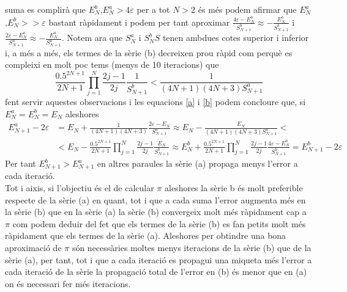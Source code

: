 \documentclass[a4paper,10pt]{article}
\renewcommand{\*}{\cdot}
\renewcommand{\epsilon}{\varepsilon}
\begin{document}
suma es complirà que $E_N^b$,$E_N^a>4\epsilon$ per a tot $N>2$ és més podem afirmar que $E_N^a$,$E_N^b>>\epsilon$ bastant ràpidament i podem per tant aproximar 
$\frac{4\epsilon-E_N^b}{S^b_{N+1}}\approx-\frac{E_N^b}{S^b_{N+1}}$ i $\frac{2\epsilon-E_N^a}{S^a_{N+1}}\approx-\frac{E_N^a}{S^a_{N+1}}$. Notem ara que $S_N^a$ i $S_N^bS$
tenen ambdues cotes superior i inferior i, a més a més, els termes de la sèrie (b) decreixen prou ràpid com perquè es compleixi en molt poc tems (menys de 10 iteracions) que
\begin{equation*}
 \frac{0.5^{2N+1}}{2N+1}\prod_{j=1}^N\frac{2j-1}{2j}\frac{1}{S^b_{N+1}}<\frac{1}{(4N+1)(4N+3)S^a_{N+1}}
\end{equation*}
fent servir aquestes observacions i les equacions \ref{a} i \ref{b} podem concloure que, si $E_N^a=E_N^b=E_N$ aleshores
\begin{equation*}
\begin{split}
 E_{N+1}^a-2\epsilon&=E_N+\frac{1}{(4N+1)(4N+3)}\frac{2\epsilon-E_N}{S^a_{N+1}}\approx E_N-\frac{E_N}{(4N+1)(4N+3)S^a_{N+1}}<\\
 &<E_N-\frac{0.5^{2N+1}}{2N+1}
 \prod_{j=1}^N\frac{2j-1}{2j}\frac{E_N}{S^b_{N+1}}\approx E_N^b+\frac{0.5^{2N+1}}{2N+1}
 \prod_{j=1}^N\frac{2j-1}{2j}\frac{4\epsilon-E_N^b}{S^b_{N+1}}=E_{N+1}^b-2\epsilon
\end{split}
 \end{equation*}
 Per tant $E_{N+1}^b>E_{N+1}^a$ en altres paraules la sèrie (a) propaga menys l'error a cada iteració.\\ Tot i aixis, si l'objectiu és el de calcular $\pi$ aleshores la sèrie
 b és molt preferible respecte de la sèrie (a) en quant, tot i que a cada suma l'error augmenta més en la sèrie (b) que en la sèrie (a) la sèrie (b) convergeix molt més
 ràpidament cap a $\pi$ com podem deduir del fet que els termes de la sèrie (b) es fan petits molt més ràpidament que els termes de la sèrie (a).
 Aleshores per obtindre una bona aproximació de $\pi$ són necessàries moltes menys iteracions de la sèrie (b) que de la sèrie (a), per tant, tot i que a cada iteració es
 propagui una miqueta més l'error a cada iteració de la sèrie la propagació total de l'error en (b) és menor que en (a) on és necessari fer més
 iteracions.
\end{document}
